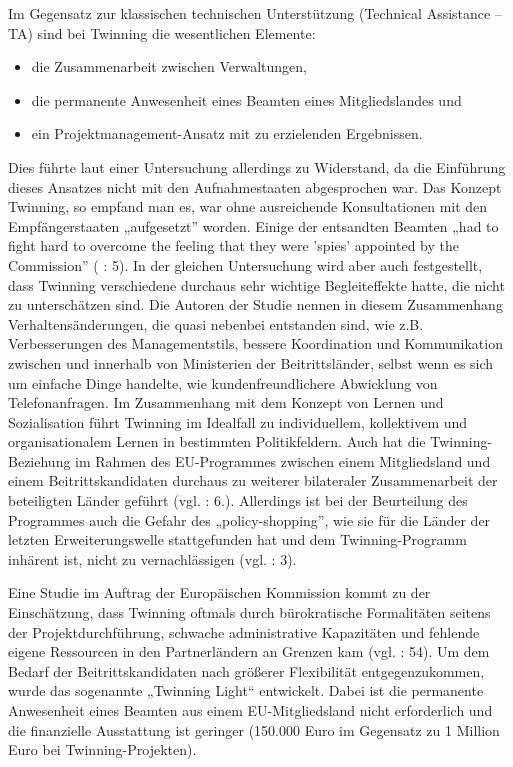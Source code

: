 Im Gegensatz zur klassischen technischen Unterstützung (Technical Assistance – TA) sind bei Twinning die wesentlichen Elemente:
\begin{itemize} \itemsep1pt \parskip0pt 
\item die Zusammenarbeit zwischen Verwaltungen, 
\item die permanente Anwesenheit eines Beamten eines Mitgliedslandes und
\item ein Projektmanagement-Ansatz mit zu erzielenden Ergebnissen. 
\end{itemize}
Dies führte laut einer Untersuchung allerdings zu Widerstand, da die Einführung dieses Ansatzes nicht mit den Aufnahmestaaten abgesprochen war. Das Konzept Twinning, so empfand man es, war ohne ausreichende Konsultationen mit den Empfängerstaaten „aufgesetzt” worden. Einige der entsandten Beamten „had to fight hard to overcome the feeling that they were 'spies' appointed by the Commission” (\cite{coojoh} : 5). In der gleichen Untersuchung wird aber auch festgestellt, dass Twinning verschiedene durchaus sehr wichtige Begleiteffekte hatte, die nicht zu unterschätzen sind. Die Autoren der Studie nennen in diesem Zusammenhang Verhaltensänderungen, die quasi nebenbei entstanden sind, wie z.B. Verbesserungen des Managementstils, bessere Koordination und Kommunikation zwischen und innerhalb von Ministerien der Beitrittsländer, selbst wenn es sich um einfache Dinge handelte, wie kundenfreundlichere Abwicklung von Telefonanfragen. Im Zusammenhang mit dem Konzept von Lernen und Sozialisation führt Twinning im Idealfall zu individuellem, kollektivem und organisationalem Lernen in bestimmten Politikfeldern. Auch hat die Twinning-Beziehung im Rahmen des EU-Programmes zwischen einem Mitgliedsland und einem Beitrittskandidaten durchaus zu weiterer bilateraler Zusammenarbeit der beteiligten Länder geführt (vgl. \cite{coojoh} : 6.). Allerdings ist bei der Beurteilung des Programmes auch die Gefahr des „policy-shopping”, wie sie für die Länder der letzten Erweiterungswelle stattgefunden hat und dem Twinning-Programm inhärent ist, nicht zu vernachlässigen (vgl. \cite{meyersah08b} : 3).\par
Eine Studie im Auftrag der Europäischen Kommission kommt zu der Einschätzung, dass Twinning oftmals durch bürokratische Formalitäten seitens der Projektdurchführung, schwache administrative Kapazitäten und fehlende eigene Ressourcen in den Partnerländern an Grenzen kam (vgl. \cite{koenigova} : 54). Um dem Bedarf der Beitrittskandidaten nach größerer Flexibilität entgegenzukommen, wurde das sogenannte „Twinning Light“ entwickelt. Dabei ist die permanente Anwesenheit eines Beamten aus einem EU-Mitgliedsland nicht erforderlich und die finanzielle Ausstattung ist geringer (150.000 Euro im Gegensatz zu 1 Million Euro bei Twinning-Projekten).\par
